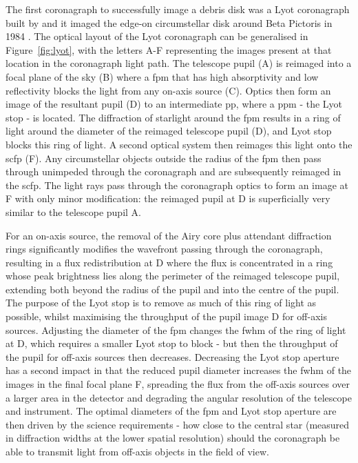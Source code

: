 \documentclass[letterpaper]{ar-1col}
\newcommand{\acc}[1]{\entry{\acs{#1}}{\acl{#1}}}
\begin{document}
The first coronagraph to successfully image a debris disk was a Lyot coronagraph built by \citet{Vilas87} and it imaged the edge-on circumstellar disk around Beta Pictoris in 1984 \citep{Smith84}.
%
The optical layout of the Lyot coronagraph can be generalised in Figure~\ref{fig:lyot}, with the letters A-F representing the images present at that location in the coronagraph light path.
%
The telescope pupil (A) is reimaged into a focal plane of the sky (B) where a \ac{fpm} that has high absorptivity and low reflectivity blocks the light from any on-axis source (C).
%
Optics then form an image of the resultant pupil (D) to an intermediate \ac{pp}, where a \ac{ppm} - the Lyot stop - is located.
%
The diffraction of starlight around the \ac{fpm} results in a ring of light around the diameter of the reimaged telescope pupil (D), and Lyot stop blocks this ring of light.
%
A second optical system then reimages this light onto the \ac{scfp} (F).
%
%
Any circumstellar objects outside the radius of the \ac{fpm} then pass through unimpeded through the coronagraph and are subsequently reimaged in the \ac{scfp}.
%
The light rays pass through the coronagraph optics to form an image at F with only minor modification: the reimaged pupil at D is superficially very similar to the telescope pupil A.

\begin{armarginnote}[]
\acc{fpm}
\acc{ppm}
\acc{scfp}
\end{armarginnote}

For an on-axis source, the removal of the Airy core plus attendant diffraction rings significantly modifies the wavefront passing through the coronagraph, resulting in a flux redistribution at D where the flux is concentrated in a ring whose peak brightness lies along the perimeter of the reimaged telescope pupil, extending both beyond the radius of the pupil and into the centre of the pupil.
%
The purpose of the Lyot stop is to remove as much of this ring of light as possible, whilst maximising the throughput of the pupil image D for off-axis sources.
%
Adjusting the diameter of the \ac{fpm} changes the \ac{fwhm} of the ring of light at D, which requires a smaller Lyot stop to block - but then the throughput of the pupil for off-axis sources then decreases.
%
Decreasing the Lyot stop aperture has a second impact in that the reduced pupil diameter increases the \ac{fwhm} of the images in the final focal plane F, spreading the flux from the off-axis sources over a larger area in the detector and degrading the angular resolution of the telescope and instrument.
%
The optimal diameters of the \ac{fpm} and Lyot stop aperture are then driven by the science requirements - how close to the central star (measured in diffraction widths at the lower spatial resolution) should the coronagraph be able to transmit light from off-axis objects in the field of view.
\end{document}
